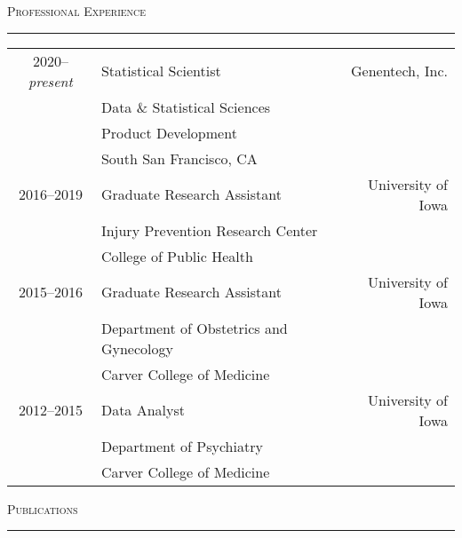 \documentclass[a4paper]{article}
\begin{document}
\begin{flushleft}
  \Large\textsc{Professional Experience}
  \textcolor{usafagrey}{\rule[0.5\baselineskip]{\textwidth}{0.75pt}}
\end{flushleft}
\vspace{-\baselineskip}

\begin{tabular*}{0.95\textwidth}{@{\extracolsep{\fill}}clr}
  2020--\textit{present} & Statistical Scientist & Genentech, Inc. \\
    & Data \& Statistical Sciences \\
    & Product Development \\
    & South San Francisco, CA \\[3pt]
  2016--2019 & Graduate Research Assistant & University of Iowa \\
   & Injury Prevention Research Center & \\
   & College of Public Health & \\[3pt]
  2015--2016 & Graduate Research Assistant & University of Iowa \\
   & Department of Obstetrics and Gynecology & \\
   & Carver College of Medicine & \\[3pt]
  2012--2015 & Data Analyst & University of Iowa \\
   & Department of Psychiatry & \\
   & Carver College of Medicine & \\[3pt]
\end{tabular*}
\vspace{0.25\baselineskip}


\begin{flushleft}
  \Large\textsc{Publications}
  \textcolor{usafagrey}{\rule[0.5\baselineskip]{\textwidth}{0.75pt}}
\end{flushleft}
\vspace{-1.5\baselineskip}
\end{document}
